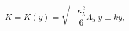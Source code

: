 \begin{equation}\label{K}
K = K(y) = \sqrt{-\frac{\kappa_5^2}{6}\Lambda_5}\ y \equiv ky, 
\end{equation}

